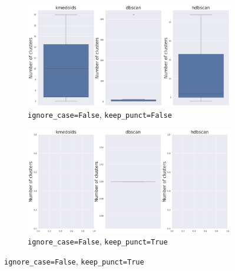 \documentclass[10pt,oneside]{report}
\begin{document}
\begin{figure}[H]
    \centering
    \begin{subfigure}[b]{\textwidth}
        \centering
        \includegraphics[width=\textwidth]{./images/mpnet_false-false_whisker.png}
        \caption{\texttt{ignore\_case=False}, \texttt{keep\_punct=False}} \label{fig:mpnet_ff_f4a_whisker}
    \end{subfigure}
    \hfill
    \begin{subfigure}[b]{\textwidth}
        \centering
        \includegraphics[width=\textwidth]{./images/mpnet_false-true_whisker.png}
        \caption{\texttt{ignore\_case=False}, \texttt{keep\_punct=True}} \label{fig:mpnet_ft_f4a_whisker}
    \end{subfigure}
\end{figure}
\end{document}
